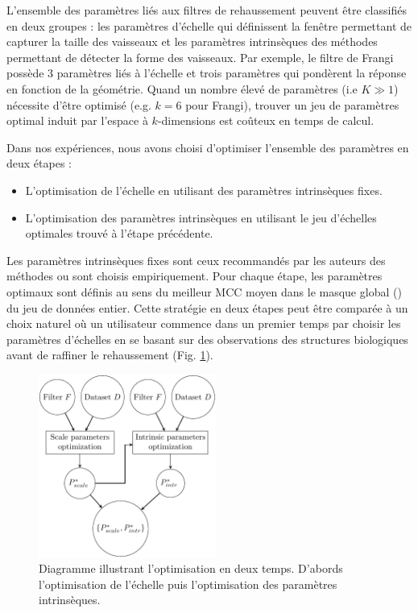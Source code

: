 L'ensemble des paramètres liés aux filtres de rehaussement peuvent être classifiés en deux groupes : les paramètres d'échelle qui définissent la fenêtre permettant de capturer la taille des vaisseaux et les paramètres intrinsèques des méthodes permettant de détecter la forme des vaisseaux. Par exemple, le filtre de Frangi possède 3 paramètres liés à l'échelle et trois paramètres qui pondèrent la réponse en fonction de la géométrie. Quand un nombre élevé de paramètres (i.e $K \gg 1$) nécessite d'être optimisé (e.g. $k=6$ pour Frangi), trouver un jeu de paramètres optimal induit par l'espace à $k$-dimensions est coûteux en temps de calcul.

Dans nos expériences, nous avons choisi d'optimiser l'ensemble des paramètres en deux étapes :

\begin{itemize}
\item L'optimisation de l'échelle en utilisant des paramètres intrinsèques fixes.
\item L'optimisation des paramètres intrinsèques en utilisant le jeu d'échelles optimales trouvé à l'étape précédente.
\end{itemize}

Les paramètres intrinsèques fixes sont ceux recommandés par les auteurs des méthodes ou sont choisis empiriquement.  Pour chaque étape, les paramètres optimaux sont définis au sens du meilleur MCC moyen dans le masque global (\maskglobal) du jeu de données entier. Cette stratégie en deux étapes peut être comparée à un choix naturel où un utilisateur commence dans un premier temps par choisir les paramètres d'échelles en se basant sur des observations des structures biologiques avant de raffiner le rehaussement (Fig. \ref{fig:flowchart_opti}).

\begin{figure}[!ht]
  \centering
  \includegraphics[height=6cm]{Images/flowchart_benchmark.pdf}
  \caption{Diagramme illustrant l'optimisation en deux temps. D'abords l'optimisation de l'échelle puis l'optimisation des paramètres intrinsèques.}
  \label{fig:flowchart_opti}
\end{figure}


